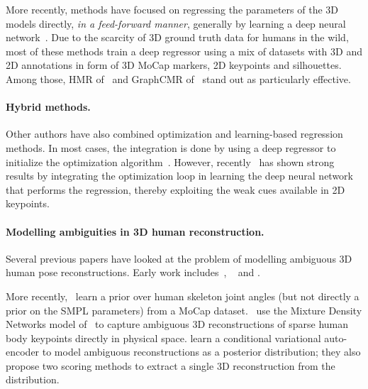 More recently, methods have focused on regressing the parameters of the 3D models directly, \emph{in a feed-forward manner}, generally by learning a deep neural network~\cite{tan17indirect,tung17self-supervised,omran18neural,pavlakos18learning,kanazawa18end-to-end}.
Due to the scarcity of 3D ground truth data for humans in the wild, most of these methods train a deep regressor using a mix of datasets with 3D and 2D annotations in form of 3D MoCap markers, 2D keypoints and silhouettes. Among those, HMR of~\citet{kanazawa18end-to-end} and GraphCMR of~\citet{kolotouros19convolutional} stand out as particularly effective.

\paragraph{Hybrid methods.}

Other authors have also combined optimization and learning-based regression methods.
In most cases, the integration is done by using a deep regressor to initialize the optimization algorithm~\cite{sigal08combined,lassner17unite,rogez18lcr-net,pavlakos18learning,varol18bodynet}.
However, recently~\citet{kolotouros19learning} has shown strong results by integrating the optimization loop in learning the deep neural network that performs the regression, thereby exploiting the weak cues available in 2D keypoints.

\paragraph{Modelling ambiguities in 3D human reconstruction.}

Several previous papers have looked at the problem of modelling ambiguous 3D human pose reconstructions. Early work includes~\citet{kinematic-jump-processes}, ~\citet{tracking-3d-human-figures} and \citet{density-prop}. 


More recently,~\citet{akhter15pose-conditioned} learn a prior over human skeleton joint angles (but not directly a prior on the SMPL parameters) from a MoCap dataset.~\citet{li19generating} use the Mixture Density Networks model of~\cite{bishop94mixture} to capture ambiguous 3D reconstructions of sparse human body keypoints directly in physical space.
\citet{sharma19monocular} learn a conditional variational auto-encoder to model ambiguous reconstructions as a posterior distribution; they also propose two scoring methods to extract a single 3D reconstruction from the distribution.

